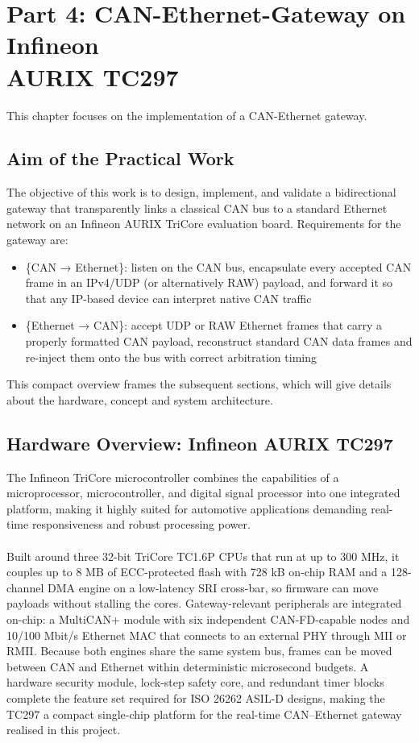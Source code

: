 \section{Part 4: CAN-Ethernet-Gateway on Infineon \\AURIX TC297}
\label{sec:can-gateway}

This chapter focuses on the implementation of a CAN-Ethernet gateway.

\subsection{Aim of the Practical Work}
The objective of this work is to design, implement, and validate a bidirectional gateway that transparently links a classical CAN bus to a standard Ethernet network on an Infineon AURIX TriCore evaluation board. Requirements for the gateway are:
\begin{itemize}
\item \{CAN → Ethernet\}: listen on the CAN bus, encapsulate every accepted CAN frame in an IPv4/UDP (or alternatively RAW) payload, and forward it so that any IP-based device can interpret native CAN traffic
\item \{Ethernet → CAN\}: accept UDP or RAW Ethernet frames that carry a properly formatted CAN payload, reconstruct standard CAN data frames and re-inject them onto the bus with correct arbitration timing
\end{itemize}
This compact overview frames the subsequent sections, which will give details about the hardware, concept and system architecture. 
\subsection{Hardware Overview: Infineon AURIX TC297}
The Infineon TriCore microcontroller combines the capabilities of a microprocessor, microcontroller, and digital signal processor into one integrated platform, making it highly suited for automotive applications demanding real-time responsiveness and robust processing power.\\\\
Built around three 32-bit TriCore TC1.6P CPUs that run at up to 300 MHz, it couples up to 8 MB of ECC-protected flash with 728 kB on-chip RAM and a 128-channel DMA engine on a low-latency SRI cross-bar, so firmware can move payloads without stalling the cores. Gateway-relevant peripherals are integrated on-chip: a MultiCAN+ module with six independent CAN-FD-capable nodes and 10/100 Mbit/s Ethernet MAC that connects to an external PHY through MII or RMII. Because both engines share the same system bus, frames can be moved between CAN and Ethernet within deterministic microsecond budgets. A hardware security module, lock-step safety core, and redundant timer blocks complete the feature set required for ISO 26262 ASIL-D designs, making the TC297 a compact single-chip platform for the real-time CAN–Ethernet gateway realised in this project\cite{infineon}.

